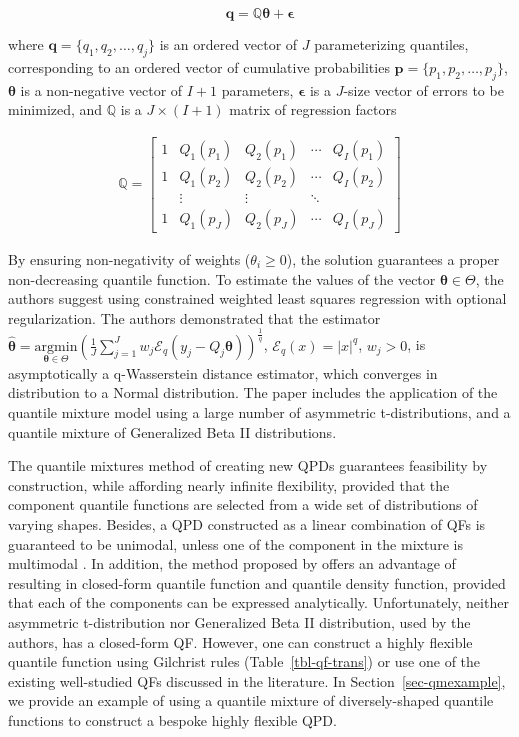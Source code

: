 \documentclass[
  fleqn,
  deca,
  blindrev
]{informs4}
\begin{document}
\[
\mathbf q=\mathbb Q \pmb\theta+\pmb\epsilon
\]

where \(\mathbf{q}=\{q_1,q_2,\dots, q_j\}\) is an ordered vector of
\(J\) parameterizing quantiles, corresponding to an ordered vector of
cumulative probabilities \(\mathbf{p}=\{p_1,p_2,\dots, p_j\}\),
\(\pmb\theta\) is a non-negative vector of \(I+1\) parameters,
\(\pmb\epsilon\) is a \(J\)-size vector of errors to be minimized, and
\(\mathbb Q\) is a \(J\times(I+1)\) matrix of regression factors

\[
\begin{gathered}
\mathbb{Q} = \left[\begin{array}{lllll}
1  &Q_1(p_1) &Q_2(p_1) &\cdots &Q_I(p_1)\\
1  &Q_1(p_2) &Q_2(p_2) &\cdots &Q_I(p_2)\\
   &\vdots   &\vdots   &\ddots \\
1  &Q_1(p_J) &Q_2(p_J) &\cdots &Q_I(p_J)
\end{array}\right]
\end{gathered}
\]

By ensuring non-negativity of weights (\(\theta_i\geq0\)), the solution
guarantees a proper non-decreasing quantile function. To estimate the
values of the vector \(\pmb\theta\in\Theta\), the authors suggest using
constrained weighted least squares regression with optional
regularization. The authors demonstrated that the estimator
\(\widehat{\pmb\theta}=\underset{\pmb\theta\in\Theta}{\text{argmin}} \left(\frac{1}{J}\sum_{j=1}^Jw_j\mathcal{E}_q(y_j-Q_j\pmb\theta)\right)^{\frac{1}{q}}\),
\(\mathcal{E}_q(x)=\lvert x \rvert^q\), \(w_j>0\), is asymptotically a
q-Wasserstein distance estimator, which converges in distribution to a
Normal distribution. The paper \citep{peng2023MixtureQuantilesEstimated}
includes the application of the quantile mixture model using a large
number of asymmetric t-distributions, and a quantile mixture of
Generalized Beta II distributions.

The quantile mixtures method of creating new QPDs guarantees feasibility
by construction, while affording nearly infinite flexibility, provided
that the component quantile functions are selected from a wide set of
distributions of varying shapes. Besides, a QPD constructed as a linear
combination of QFs is guaranteed to be unimodal, unless one of the
component in the mixture is multimodal \citep[see][ for
examples]{gilchrist2000StatisticalModellingQuantile}. In addition, the
method proposed by \citep{peng2023MixtureQuantilesEstimated} offers an
advantage of resulting in closed-form quantile function and quantile
density function, provided that each of the components can be expressed
analytically. Unfortunately, neither asymmetric t-distribution nor
Generalized Beta II distribution, used by the authors, has a closed-form
QF. However, one can construct a highly flexible quantile function using
Gilchrist rules (Table~\ref{tbl-qf-trans}) or use one of the existing
well-studied QFs discussed in the literature. In
Section~\ref{sec-qmexample}, we provide an example of using a quantile
mixture of diversely-shaped quantile functions to construct a bespoke
highly flexible QPD.
\end{document}
